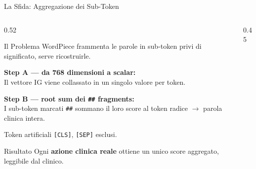 \documentclass[aspectratio=169, 10pt]{beamer}
\begin{document}
\begin{frame}{La Sfida: Aggregazione dei Sub-Token}
  \begin{columns}[c, onlytextwidth]
    \begin{column}{0.52\textwidth}
      \begin{alertblock}{Il Problema}
        WordPiece frammenta le parole in sub-token privi di significato, serve ricostruirle.
      \end{alertblock}

      \vspace{0.5em}
      \textbf{Step A — da 768 dimensioni a scalar:}\\
      Il vettore IG viene collassato in un
      singolo valore per token.

      \vspace{0.2em}
      \textbf{Step B — root sum dei \texttt{\#\#} fragments:}\\
      I sub-token marcati \texttt{\#\#} sommano il loro score
      al token radice $\to$ parola clinica intera.

      \vspace{0.2em}
      Token artificiali \texttt{[CLS]}, \texttt{[SEP]} esclusi.

      \vspace{0.3em}
      \begin{exampleblock}{Risultato}
        Ogni \textbf{azione clinica reale} ottiene un
        unico score aggregato, leggibile dal clinico.
      \end{exampleblock}
    \end{column}

    \begin{column}{0.45\textwidth}
      \centering
\end{column}
\end{columns}
\end{frame}
\end{document}
